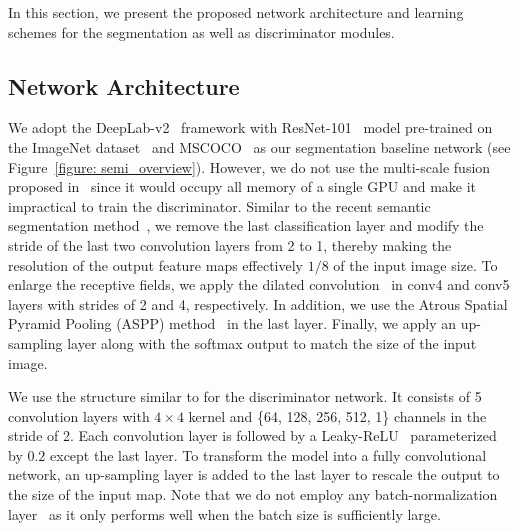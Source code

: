 \documentclass{bmvc2k}
\begin{document}
	In this section, we present the proposed network architecture and learning schemes for the segmentation as well as discriminator modules.
	
	\subsection{Network Architecture}
	\vspace{-2mm}{\flushleft \bf Segmentation network.}
	We adopt the DeepLab-v2~\cite{deeplab} framework with ResNet-101~\cite{resnet} model pre-trained on the ImageNet dataset~\cite{imagenet} and MSCOCO~\cite{lin2014microsoft} as our segmentation baseline network 
	(see Figure~\ref{figure: semi_overview}).
	However, we do not use the multi-scale fusion proposed in~\cite{deeplab} since it 
	would occupy all memory of a single GPU and make it impractical 
	to train the discriminator.
	Similar to the recent semantic segmentation method~\cite{deeplab,dilated}, we remove the last classification layer and modify the stride of the last two convolution layers from 2 to 1,
	thereby making the resolution of the output feature maps effectively $1/8$  
	of the input image size.
	To enlarge the receptive fields, we apply the dilated convolution~\cite{dilated} in conv4 and conv5 layers with strides of 2 and 4, respectively.
	In addition, we use the Atrous Spatial Pyramid Pooling (ASPP) method~\cite{deeplab} in the last layer. 
	Finally, we apply an up-sampling layer along with the softmax output to match the size of the input image.
	
	\vspace{-2mm}{\flushleft \bf Discriminator network.}
	We use the structure similar to \cite{dcgan} for the discriminator network.
	It consists of 5 convolution layers with $4 \times 4$ kernel and \{64, 128, 256, 512, 1\} channels in the stride of 2. 
	Each convolution layer is followed by a Leaky-ReLU~\cite{maas2013rectifier} parameterized by $0.2$ except the last layer.
	To transform the model into a fully convolutional network, an up-sampling layer is added to the last layer to rescale the output to the size of the input map.
	Note that we do not employ any batch-normalization layer~\cite{ioffe2015batch} as it only performs well when the batch size is sufficiently large. 
	
\end{document}

